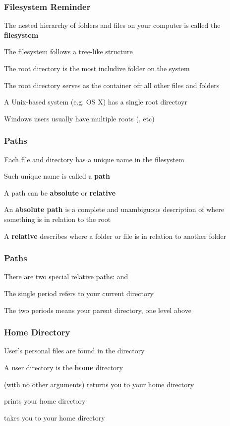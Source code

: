 \documentclass[12pt]{beamer}\usepackage[]{graphicx}\usepackage[]{color}
\begin{document}

\begin{frame}
\frametitle{Filesystem Reminder}
\bi
  \item The nested hierarchy of folders and files on your computer is called the \textbf{filesystem}
  \item The filesystem follows a tree-like structure
  \item The root directory is the most includive folder on the system
  \item The root directory serves as the container ofr all other files and folders
  \item A Unix-based system (e.g. OS X) has a single root directoyr
  \item Windows users usually have multiple roots (, etc)
\ei
\end{frame}


\begin{frame}
\frametitle{Paths}
\bi
  \item Each file and directory has a unique name in the filesystem
  \item Such unique name is called a \textbf{path}
  \item A path can be \textbf{absolute} or \textbf{relative}
  \item An \textbf{absolute path} is a complete and unambiguous description of where something is in relation to the root
  \item A \textbf{relative} describes where a folder or file is in relation to another folder
\ei
\end{frame}


\begin{frame}
\frametitle{Paths}
\bi
  \item There are two special relative paths:  and 
  \item The single period  refers to your current directory
  \item The two periods means your parent directory, one level above
\ei
\end{frame}


\begin{frame}
\frametitle{Home Directory}
\bi
  \item User's personal files are found in the  directory
  \item A user directory is the \textbf{home} directory
  \item {\hilit {}} (with no other arguments) returns you to your home directory
  \item {\hilit {}} prints your home directory
  \item {\hilit {}} takes you to your home directory
\ei
\end{frame}
\end{document}
